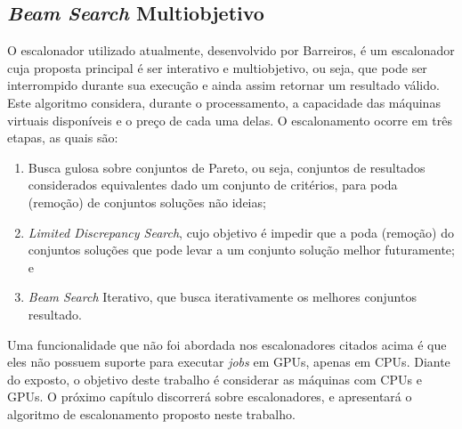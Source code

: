 \subsection{\textit{Beam Search} Multiobjetivo}
O escalonador utilizado atualmente, desenvolvido por Barreiros\cite{BioNimbuZ_Willian_C99}, é um escalonador cuja proposta principal é ser interativo e multiobjetivo, ou seja, que pode ser interrompido durante sua execução e ainda assim retornar um resultado válido. Este algoritmo considera, durante o processamento, a capacidade das máquinas virtuais disponíveis e o preço de cada uma delas. O escalonamento ocorre em três etapas, as quais são:
\begin{enumerate}
	\item Busca gulosa sobre conjuntos de Pareto, ou seja, conjuntos de resultados considerados equivalentes dado um conjunto de critérios, para poda (remoção) de conjuntos soluções não ideias;
	\item \textit{Limited Discrepancy Search}\cite{Harvey:1995:LDS:1625855.1625935}, cujo objetivo é impedir que a poda (remoção) do conjuntos soluções que pode levar a um conjunto solução melhor futuramente; e
	\item \textit{Beam Search} Iterativo, que busca iterativamente os melhores conjuntos resultado.
\end{enumerate}

Uma funcionalidade que não foi abordada nos escalonadores citados acima é que eles não possuem suporte para executar \textit{jobs} em \acrshort{GPU}s, apenas em \acrshort{CPU}s. Diante do exposto, o objetivo deste trabalho é considerar as máquinas com \acrshort{CPU}s e \acrshort{GPU}s. O próximo capítulo discorrerá sobre escalonadores, e apresentará o algoritmo de escalonamento proposto neste trabalho.